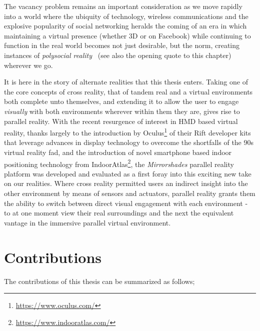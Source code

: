 The vacancy problem remains an important consideration as we move rapidly into a world where the ubiquity of technology, wireless communications and the explosive popularity of social networking heralds the coming of an era in which maintaining a virtual presence (whether 3D or on Facebook) while continuing to function in the real world becomes not just desirable, but the norm, creating instances of \textit{polysocial reality}~\cite{Applin2012} (see also the opening quote to this chapter) wherever we go.

It is here in the story of alternate realities that this thesis enters. Taking one of the core concepts of cross reality, that of tandem real and a virtual environments both complete unto themselves, and extending it to allow the user to engage \textit{visually} with both environments wherever within them they are, gives rise to parallel reality. With the recent resurgence of interest in HMD based virtual reality, thanks largely to the introduction by Oculus\footnote{\url{https://www.oculus.com/}} of their Rift developer kits that leverage advances in display technology to overcome the shortfalls of the 90s virtual reality fad, and the introduction of novel smartphone based indoor positioning technology from IndoorAtlas\footnote{\url{https://www.indooratlas.com/}}, the \textit{Mirrorshades} parallel reality platform was developed and evaluated as a first foray into this exciting new take on our realities. Where cross reality permitted users an indirect insight into the other environment by means of sensors and actuators, parallel reality grants them the ability to switch between direct visual engagement with each environment - to at one moment view their real surroundings and the next the equivalent vantage in the immersive parallel virtual environment.


\section{Contributions}
\label{intro-contributions}
The contributions of this thesis can be summarized as follows;

